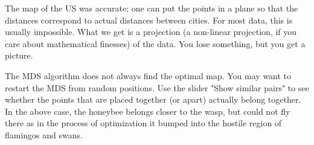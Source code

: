 The map of the US was accurate: one can put the points in a plane so that the distances correspond to actual distances between cities. For most data, this is usually impossible. What we get is a projection (a non-linear projection, if you care about mathematical finesses) of the data. You lose something, but you get a picture.

The MDS algorithm does not always find the optimal map. You may want to restart the MDS  from random positions. Use the slider "Show similar pairs" to see whether the points that are placed together (or apart) actually belong together. In the above case, the honeybee belongs closer to the wasp, but could not fly there as in the process of optimization it bumped into the hostile region of flamingos and swans.
